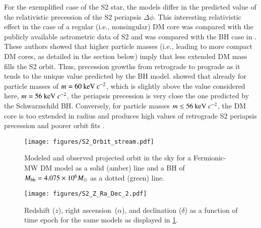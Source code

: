 \documentclass[twocolumn]{aa}
\begin{document}
For the exemplified case of the S2 star, the models differ in the predicted value of the relativistic precession of the S2 periapsis $\Delta \phi$. This interesting relativistic effect in the case of a regular (i.e., nonsingular) DM core was compared with the publicly available astrometric data of S2 and was compared with the BH case in \cite{2022MNRAS.511L..35A}. These authors showed that higher particle masses (i.e., leading to more compact DM cores, as detailed in the section below) imply that less extended DM mass fills the S2 orbit. Thus, precession growths from retrograde to prograde as it tends to the unique value predicted by the BH model. \cite{2022MNRAS.511L..35A} showed that already for particle masses of $m = 60~{\rm keV}~c^{-2}$, which is slightly above the value considered here, $m=56~{\rm keV}~c^{-2}$, the periapsis precession is very close the one predicted by the Schwarzschild BH. Conversely, for particle masses $m\lesssim 56~{\rm keV}~c^{-2}$, the DM core is too extended in radius and produces high values of retrograde S2 periapsis precession and poorer orbit fits \citep{2020A&A...641A..34B,2022MNRAS.511L..35A}. %
%
%
\begin{figure}
   \texttt{[image: figures/S2\_Orbit\_stream.pdf]}
\caption{Modeled and observed projected orbit in the sky for a Fermionic-MW DM model as a solid (amber) line and a BH of $M_{\rm bh}=4.075\times 10^6 M_\odot$ as a dotted (green) line.}
   \label{fig:S2_fit}
\end{figure}

\begin{figure}
   \texttt{[image: figures/S2\_Z\_Ra\_Dec\_2.pdf]}
   \caption{Redshift ($z$), right ascension~($\alpha$), and declination ($\delta$) as a function of time epoch for the same models as
   displayed in \cref{fig:S2_fit}.}
   \label{fig:S2_fit_b}
\end{figure}
\end{document}

